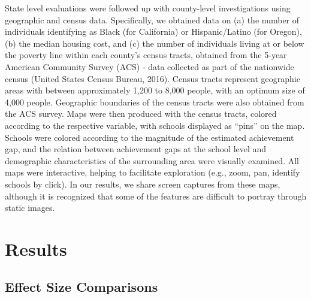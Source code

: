 \documentclass[man, fleqn, noextraspace]{apa6}
\theoremstyle{definition}
\theoremstyle{definition}
\theoremstyle{definition}
\theoremstyle{remark}
\begin{document}
State level evaluations were followed up with county-level
investigations using geographic and census data. Specifically, we
obtained data on (a) the number of individuals identifying as Black (for
California) or Hispanic/Latino (for Oregon), (b) the median housing
cost, and (c) the number of individuals living at or below the poverty
line within each county's census tracts, obtained from the 5-year
American Community Survey (ACS) - data collected as part of the
nationwide census (United States Census Bureau, 2016). Census tracts
represent geographic areas with between approximately 1,200 to 8,000
people, with an optimum size of 4,000 people. Geographic boundaries of
the census tracts were also obtained from the ACS survey. Maps were then
produced with the census tracts, colored according to the respective
variable, with schools displayed as \enquote{pins} on the map. Schools
were colored according to the magnitude of the estimated achievement
gap, and the relation between achievement gaps at the school level and
demographic characteristics of the surrounding area were visually
examined. All maps were interactive, helping to facilitate exploration
(e.g., zoom, pan, identify schools by click). In our results, we share
screen captures from these maps, although it is recognized that some of
the features are difficult to portray through static images.

\hypertarget{results}{%
\section{Results}\label{results}}

\hypertarget{effect-size-comparisons}{%
\subsection{Effect Size Comparisons}\label{effect-size-comparisons}}
\end{document}
